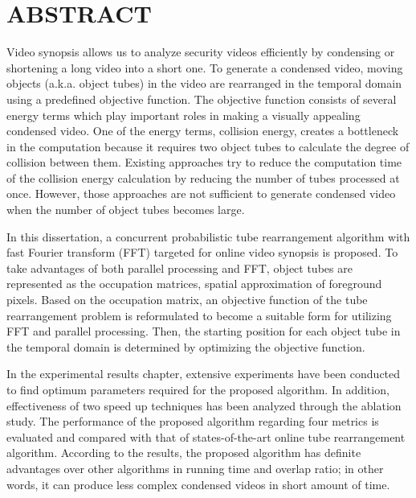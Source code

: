 \documentclass[11pt]{hyu_thesis}
\begin{document}
\restoregeometry
\frontmatter

\tableofcontents
\newpage
\listoffigures
\newpage
\listoftables
\newpage

\mainmatter

\chapter*{ABSTRACT}
Video synopsis allows us to analyze security videos efficiently by condensing or shortening a long video into a short one. To generate a condensed video, moving objects (a.k.a. object tubes) in the video are rearranged in the temporal domain using a predefined objective function. The objective function consists of several energy terms which play important roles in making a visually appealing condensed video. One of the energy terms, collision energy, creates a bottleneck in the computation because it requires two object tubes to calculate the degree of collision between them. Existing approaches try to reduce the computation time of the collision energy calculation by reducing the number of tubes processed at once. However, those approaches are not sufficient to generate condensed video when the number of object tubes becomes large.

In this dissertation, a concurrent probabilistic tube rearrangement algorithm with fast Fourier transform (FFT) targeted for online video synopsis is proposed. To take advantages of both parallel processing and FFT, object tubes are represented as the occupation matrices, spatial approximation of foreground pixels. Based on the occupation matrix, an objective function of the tube rearrangement problem is reformulated to become a suitable form for utilizing FFT and parallel processing. Then, the starting position for each object tube in the temporal domain is determined by optimizing the objective function. 

In the experimental results chapter, extensive experiments have been conducted to find optimum parameters required for the proposed algorithm. In addition, effectiveness of two speed up techniques has been analyzed through the ablation study. The performance of the proposed algorithm regarding four metrics is evaluated and compared with that of states-of-the-art online tube rearrangement algorithm. According to the results, the proposed algorithm has definite advantages over other algorithms in running time and overlap ratio; in other words, it can produce less complex condensed videos in short amount of time.
\newpage
\end{document}
